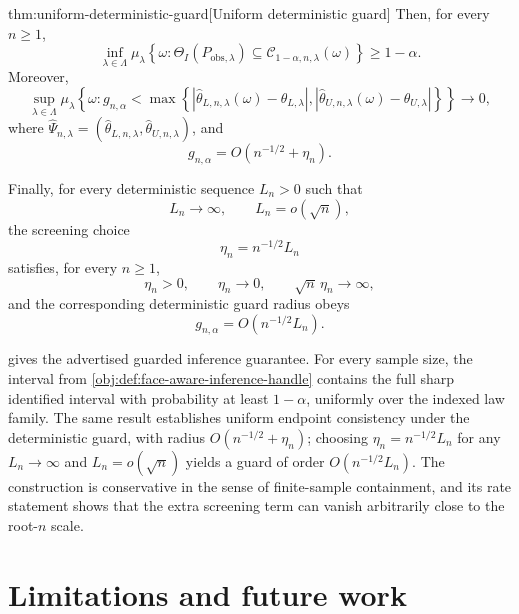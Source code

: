 \documentclass[11pt]{article}
\begin{document}
\begin{theoremv}{thm:uniform-deterministic-guard}[Uniform deterministic guard]
Then, for every \(n\ge 1\),
\[
\inf_{\lambda\in\Lambda}
\mu_\lambda\!\left\{
\omega:
\Theta_I(P_{\mathrm{obs},\lambda})
\subseteq
\mathcal C_{1-\alpha,n,\lambda}(\omega)
\right\}
\ge
1-\alpha .
\]
Moreover,
\[
\sup_{\lambda\in\Lambda}
\mu_\lambda\!\left\{
\omega:
g_{n,\alpha}
<
\max\left\{
\left|\widehat\theta_{L,n,\lambda}(\omega)-\theta_{L,\lambda}\right|,
\left|\widehat\theta_{U,n,\lambda}(\omega)-\theta_{U,\lambda}\right|
\right\}
\right\}
\longrightarrow 0,
\]
where \(\widehat\Psi_{n,\lambda}=(\widehat\theta_{L,n,\lambda},\widehat\theta_{U,n,\lambda})\), and
\[
g_{n,\alpha}
=
O\!\left(n^{-1/2}+\eta_n\right).
\]

Finally, for every deterministic sequence \(L_n>0\) such that
\[
L_n\to\infty,
\qquad
L_n=o(\sqrt n),
\]
the screening choice
\[
\eta_n=n^{-1/2}L_n
\]
satisfies, for every \(n\ge 1\),
\[
\eta_n>0,
\qquad
\eta_n\to0,
\qquad
\sqrt n\,\eta_n\to\infty,
\]
and the corresponding deterministic guard radius obeys
\[
g_{n,\alpha}
=
O\!\left(n^{-1/2}L_n\right).
\]
\end{theoremv}

 gives the advertised guarded inference guarantee.  For every sample size, the interval from \cref{obj:def:face-aware-inference-handle} contains the full sharp identified interval with probability at least \(1-\alpha\), uniformly over the indexed law family.  The same result establishes uniform endpoint consistency under the deterministic guard, with radius \(O(n^{-1/2}+\eta_n)\); choosing \(\eta_n=n^{-1/2}L_n\) for any \(L_n\to\infty\) and \(L_n=o(\sqrt n)\) yields a guard of order \(O(n^{-1/2}L_n)\).  The construction is conservative in the sense of finite-sample containment, and its rate statement shows that the extra screening term can vanish arbitrarily close to the root-\(n\) scale.


\section{Limitations and future work}\label{sec:limitations}
\end{document}
